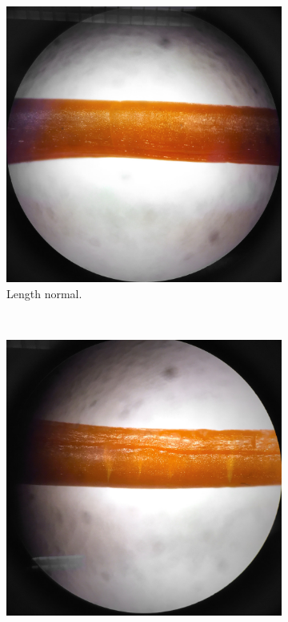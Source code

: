 \begin{figure}[h!]
        \centering
        \begin{subfigure}[b]{0.3\textwidth}
                \includegraphics[width=\textwidth]{./figures/20-ng-normal}
                \caption{Length normal.}
                \label{fig:20-og-normal}
        \end{subfigure}%
        ~ %
        \begin{subfigure}[b]{0.3\textwidth}
                \includegraphics[width=\textwidth]{./figures/20-ng-defect}

\end{subfigure}
\end{figure}
